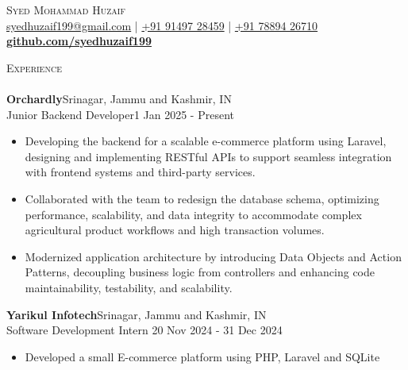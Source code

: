 \documentclass[a4paper]{article}
\newcommand{\lineunder} {
    \vspace*{-8pt} \\
    \hspace*{-18pt} \hrulefill \\
}
\newcommand{\header} [1] {
    {\hspace*{-18pt}\vspace*{6pt} \textsc{#1}}
    \vspace*{-6pt} \lineunder
}
\begin{document}
    \vspace*{-40pt}

  \vspace*{-2pt}
  \begin{center}
    {\Huge \scshape {Syed Mohammad Huzaif}}\\
    \vspace*{2pt}
    \href{mailto:syedhuzaif199@gmail.com}{syedhuzaif199@gmail.com} | \href{tel:+919149728459}{+91 91497 28459} | \href{tel:+917889426710}{+91 78894 26710}\\
    \vspace*{2pt}
    \textbf{\href{https://github.com/syedhuzaif199}{github.com/syedhuzaif199}}
  \end{center}

      \header{Experience}
    \vspace{2mm}
        \textbf{Orchardly}\hfill Srinagar, Jammu and Kashmir, IN\\
    Junior Backend Developer\hfill 1 Jan 2025 - Present\\
    \vspace{-2mm}
    \begin{itemize}
    \item[] Developing the backend for a scalable e-commerce platform using Laravel, designing and implementing RESTful APIs to support seamless integration with frontend systems and third-party services.

    \item[] Collaborated with the team to redesign the database schema, optimizing performance, scalability, and data integrity to accommodate complex agricultural product workflows and high transaction volumes.

    \item[] Modernized application architecture by introducing Data Objects and Action Patterns, decoupling business logic from controllers and enhancing code maintainability, testability, and scalability.
    \end{itemize}
      \vspace{2mm}
      \textbf{Yarikul Infotech}\hfill Srinagar, Jammu and Kashmir, IN\\
    Software Development Intern \hfill 20 Nov 2024 - 31 Dec 2024\\
    \vspace{-2mm}
    \begin{itemize}
    \item[] Developed a small E-commerce platform using PHP, Laravel and SQLite
    \end{itemize}
\end{document}
